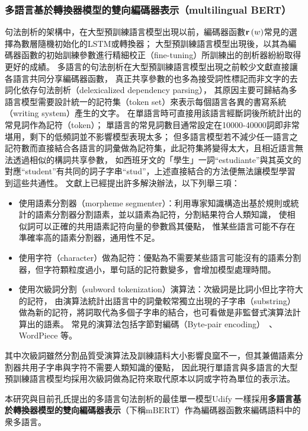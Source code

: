 \subsubsection{多語言基於轉換器模型的雙向編碼器表示（multilingual BERT）}

句法剖析的架構中，在大型預訓練語言模型出現以前，編碼器函數$\mathbf{r}\left(w\right)$常見的選擇為數層隨機初始化的LSTM或轉換器；
大型預訓練語言模型出現後，以其為編碼器函數的初始訓練參數進行精細校正（fine-tuning）所訓練出的剖析器紛紛取得更好的成績。
多語言的句法剖析在大型預訓練語言模型出現之前較少文獻直接讓各語言共同分享編碼器函數，
真正共享參數的也多為接受詞性標記而非文字的去詞化依存句法剖析（delexicalized dependency parsing），
其原因主要可歸結為多語言模型需要設計統一的記符集（token set）來表示每個語言各異的書寫系統（writing system）產生的文字。
在單語言時可直接用該語言經斷詞後所統計出的常見詞作為記符（token）；
單語言的常見詞數目通常設定在10000-40000詞即非常堪用，剩下的低頻詞並不影響模型表現太多；
但多語言模型若不減少任一語言之記符數而直接結合各語言的詞彙做為記符集，此記符集將變得太大，且相近語言無法透過相似的構詞共享參數，
如西班牙文的「學生」一詞``estudiante''與其英文的對應``student''有共同的詞子字串``stud''，上述直接結合的方法便無法讓模型學習到這些共通性。
文獻上已經提出許多解決辦法，以下列舉三項：
\begin{itemize}
    \item 使用語素分割器（morpheme segmenter）：利用專家知識構造出基於規則或統計的語素分割器分割語素，並以語素為記符，分割結果符合人類知識，
使相似詞可以正確的共用語素記符向量的參數爲其優點，
惟某些語言可能不存在準確率高的語素分割器，通用性不足。
    \item 使用字符（character）做為記符：優點為不需要某些語言可能沒有的語素分割器，但字符顆粒度過小，單句話的記符數變多，會增加模型處理時間。
    \item 使用次級詞分割（subword tokenization）演算法：次級詞是比詞小但比字符大的記符，
由演算法統計出語言中的詞彙較常獨立出現的子字串（substring）做為新的記符，將詞取代為多個子字串的結合，也可看做是非監督式演算法計算出的語素。
常見的演算法包括字節對編碼（Byte-pair encoding）~\cite{sennrich-etal-2016-neural}、WordPiece \cite{schuster2012japanese}等。
\end{itemize}
其中次級詞雖然分割品質受演算法及訓練語料大小影響良窳不一，但其兼備語素分割器共用子字串與字符不需要人類知識的優點，
因此現行單語言與多語言的大型預訓練語言模型均採用次級詞做為記符來取代原本以詞或字符為單位的表示法。

本研究與目前孔氏提出的多語言句法剖析的最佳單一模型Udify\cite{kondratyuk-straka-2019-75}
一樣採用\textbf{多語言基於轉換器模型的雙向編碼器表示}（下稱$\mathrm{mBERT}$）作為編碼器函數來編碼語料中的衆多語言。

